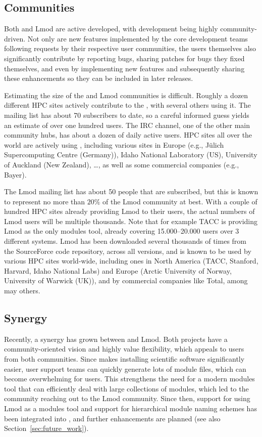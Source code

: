 \subsection{Communities}
\label{sec:communities}

Both \easybuild{} and Lmod are active developed, with development being
highly community-driven. Not only are new features implemented by the core
development teams following requests by their respective user communities, the
users themselves also significantly contribute by reporting bugs, sharing patches
for bugs they fixed themselves, and even by implementing new features
and subsequently sharing these enhancements so they can be included in later
releases.

Estimating the size of the \easybuild{} and Lmod communities is difficult.
Roughly a dozen different HPC sites actively contribute to the \easybuild{}, with
several others using it. The \easybuild{} mailing list has about 70 subscribers
to date, so a careful informed guess yields an estimate of over one hundred
users. The \easybuild{} IRC channel, one of the other main community hubs, has
about a dozen of daily active users. HPC sites all over the world are
actively using \easybuild{}, including various sites in Europe (e.g., J\"ulich
Supercomputing Centre (Germany)), Idaho National Laboratory (US), University of
Auckland (New Zealand), \ldots, as well as some commercial companies (e.g., Bayer).

The Lmod mailing list has about 50 people that are subscribed, but this
is known to represent no more than $20\%$ of the Lmod community at best. With a
couple of hundred HPC sites already providing Lmod to their users, the actual
numbers of Lmod users will be multiple thousands. Note that for example TACC is
providing Lmod as the only modules tool, already covering 15.000--20.000 users
over 3 different systems. Lmod has been downloaded several thousands of times
from the SourceForce code repository, across all versions, and is known to be
used by various HPC sites world-wide, including ones in North America (TACC,
Stanford, Harvard, Idaho National Labs) and Europe (Arctic
University of Norway, University of Warwick (UK)), and by commercial companies
like Total, among may others.

\subsection{Synergy}

Recently, a synergy has grown between \easybuild{} and Lmod. Both projects have a
community-oriented vision and highly value flexibility, which appeals to users
from both communities. Since \easybuild{} makes installing scientific software
significantly easier, user support teams can quickly generate lots of module
files, which can become overwhelming for users. This strengthens the need for a
modern modules tool that can efficiently deal with large collections of modules,
which led to the \easybuild{} community reaching out to the Lmod community.
Since then, support for using Lmod as a modules tool and support for hierarchical
module naming schemes has been integrated into \easybuild{}, and further
enhancements are planned (see also Section~\ref{sec:future_work}).

